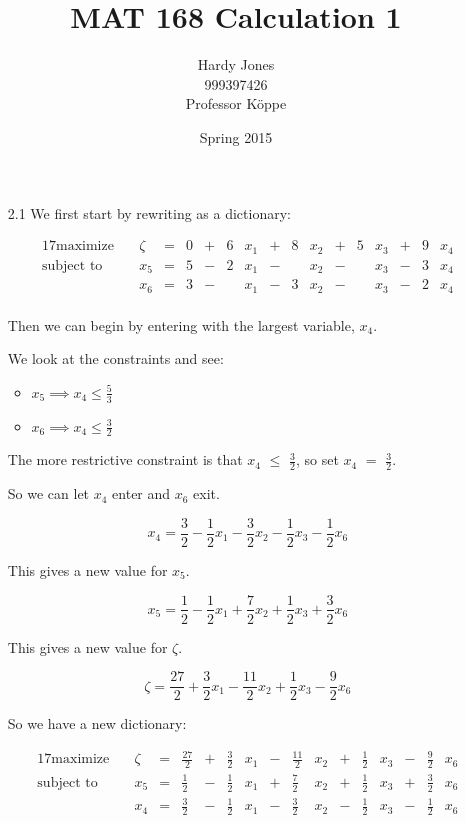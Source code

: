 \documentclass[12pt,letterpaper]{article}
\title{MAT 168 Calculation 1\vspace{-2ex}}
\author{Hardy Jones\\
        999397426\\
        Professor K\"{o}ppe\vspace{-2ex}}
\date{Spring 2015}
\newcommand*\enterexit[2]{
  So we can let #1 enter and #2 exit.
}
\newcommand*\morerestrictive[2]{
  The more restrictive constraint is that #1 $\leq$ #2, so set #1 $=$ #2.
}
\newcommand*\newdict{
  So we have a new dictionary:
}
\newcommand*\newvalue[1]{
  This gives a new value for #1.
}
\begin{document}
  \maketitle

  \begin{enumerate}
    \item [2.1]
      We first start by rewriting as a dictionary:

      \begin{alignat*}{17}
        \text{maximize}   \quad & \zeta & {}={} & 0 & {}+{} & 6 & x_1 & {}+{} & 8 & x_2 & {}+{} & 5 & x_3 & {}+{} & 9 & x_4 \\
        \text{subject to} \quad & x_5   & {}={} & 5 & {}-{} & 2 & x_1 & {}-{} &   & x_2 & {}-{} &   & x_3 & {}-{} & 3 & x_4 \\
                                & x_6   & {}={} & 3 & {}-{} &   & x_1 & {}-{} & 3 & x_2 & {}-{} &   & x_3 & {}-{} & 2 & x_4 \\
      \end{alignat*}

      Then we can begin by entering with the largest variable, $x_4$.

      We look at the constraints and see:
      \begin{itemize}
        \item $x_5 \implies x_4 \leq \frac{5}{3}$
        \item $x_6 \implies x_4 \leq \frac{3}{2}$
      \end{itemize}

      \morerestrictive{$x_4$}{$\frac{3}{2}$}

      \enterexit{$x_4$}{$x_6$}

      \[
        x_4 = \frac{3}{2} - \frac{1}{2}x_1 - \frac{3}{2}x_2 - \frac{1}{2}x_3 - \frac{1}{2}x_6
      \]

      \newvalue{$x_5$}

      \[
        x_5 = \frac{1}{2} - \frac{1}{2}x_1 + \frac{7}{2}x_2 + \frac{1}{2}x_3 + \frac{3}{2}x_6
      \]

      \newvalue{$\zeta$}

      \[
        \zeta = \frac{27}{2} + \frac{3}{2}x_1 - \frac{11}{2}x_2 + \frac{1}{2}x_3 - \frac{9}{2}x_6
      \]

      \newdict

      \begin{alignat*}{17}
        \text{maximize}   \quad & \zeta & {}={} & \frac{27}{2} & {}+{} & \frac{3}{2} & x_1 & {}-{} & \frac{11}{2} & x_2 & {}+{} & \frac{1}{2} & x_3 & {}-{} & \frac{9}{2} & x_6 \\
        \text{subject to} \quad & x_5   & {}={} & \frac{1}{2}  & {}-{} & \frac{1}{2} & x_1 & {}+{} & \frac{7}{2}  & x_2 & {}+{} & \frac{1}{2} & x_3 & {}+{} & \frac{3}{2} & x_6 \\
                                & x_4   & {}={} & \frac{3}{2}  & {}-{} & \frac{1}{2} & x_1 & {}-{} & \frac{3}{2}  & x_2 & {}-{} & \frac{1}{2} & x_3 & {}-{} & \frac{1}{2} & x_6 \\
      \end{alignat*}


\end{enumerate}
\end{document}
